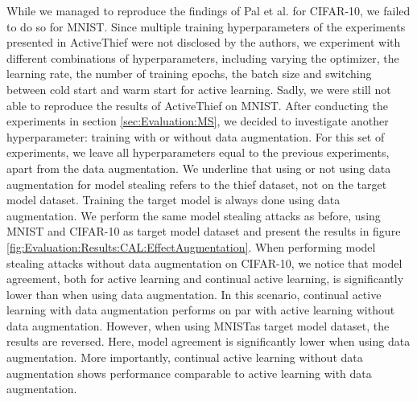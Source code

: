 While we managed to reproduce the findings of Pal et al. for CIFAR-10, we failed to do so for MNIST. Since multiple training hyperparameters of the experiments
presented in ActiveThief were not disclosed by the authors, we experiment with different combinations of hyperparameters, including varying the optimizer,
the learning rate, the number of training epochs, the batch size and switching between cold start and warm start for active learning. Sadly, we were still
not able to reproduce the results of ActiveThief on MNIST. After conducting the experiments in section \ref{sec:Evaluation:MS}, we decided to investigate
another hyperparameter: training with or without data augmentation. For this set of experiments, we leave all hyperparameters equal to the previous experiments,
apart from the data augmentation. We underline that using or not using data augmentation for model stealing refers to the thief dataset, not on the target
model dataset. Training the target model is always done using data augmentation. We perform the same model stealing attacks as before, using MNIST and
CIFAR-10 as target model dataset and present the results in figure \ref{fig:Evaluation:Results:CAL:EffectAugmentation}. When performing model stealing attacks
without data augmentation on CIFAR-10, we notice that model agreement, both for active learning and continual active learning, is significantly lower than
when using data augmentation. In this scenario, continual active learning with data augmentation performs on par with active learning without data augmentation.
However, when using MNISTas target model dataset, the results are reversed. Here, model agreement is significantly lower when using data augmentation.
More importantly, continual active learning without data augmentation shows performance comparable to active learning with data augmentation. \par

